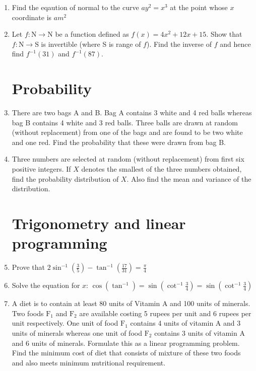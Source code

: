 \documentclass[12pt,-letter paper]{article}
\providecommand{\brak}[1]{\ensuremath{\left(#1\right)}}
\providecommand{\brak}[1]{\ensuremath{\left(#1\right)}}
\begin{document}
\begin{enumerate}
	\item Find the eqaution of normal to the curve $ay^2 = x^3$ at the point whose $x$ coordinate is $am^2$
	
	\item Let $f: \text{N} \rightarrow \text{N}$ be a function defined as 
	$f(x) = 4x^2 + 12x + 15.$
Show that $f: \text{N} \rightarrow \text{S}$ is invertible (where S is range of $f$).
Find the inverse of $f$ and hence find $f^{-1}(31)$ and $f^{-1}(87)$.

\section{Probability}
	\item There are two bags A and B. Bag A contains 3 white and 4 red balls whereas bag B contains 4 white and 3 red balls. Three balls are drawn at random (without replacement) from one of the bags and are found to be two white and one red. Find the probability that these were drawn from bag B.

	\item Three numbers are selected at random (without replacement) from first six positive integers. If $X$ denotes the smallest of the three numbers obtained, find the probability distribution of $X$. Also find the mean and variance of the distribution.

\section{Trigonometry and linear programming}
	\item Prove that $ 2\sin^{-1} \brak{\frac{3}{5}} - \tan^{-1} \brak{\frac{17}{31}} = \frac{\pi}{4}$

	\item Solve the equation for $x$: $\cos (\tan^{-1}) = \sin \brak{\cot^{-1} \frac{3}{4}} = \sin \brak{\cot^{-1} \frac{3}{4}}$

	\item A diet is to contain at least 80 units of Vitamin A and 100 units of minerals. 
Two foods $\text{F}_1$ and $\text{F}_2$ are available costing 5 rupees per unit and 6 rupees per unit respectively. 
One unit of food $\text{F}_1$ contains 4 units of vitamin A and 3 units of minerals whereas
 one unit of food $\text{F}_2$ contains 3 units of vitamin A and 6 units of minerals. 
 Formulate this as a linear programming problem. Find the minimum cost of diet that consists of mixture of these two foods and also meets minimum nutritional requirement.

\end{enumerate}
\end{document}
